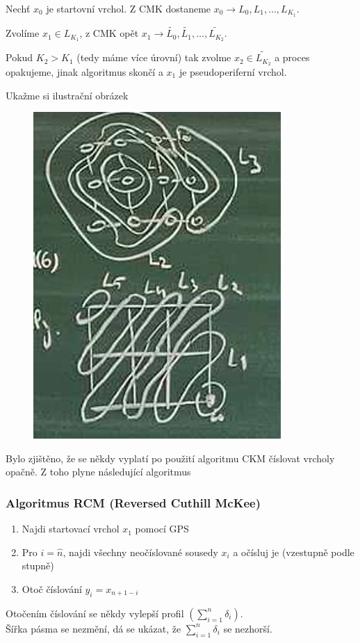 \documentclass[../main.tex]{subfiles}
\begin{document}
Nechť $x_0$ je startovní vrchol. Z CMK dostaneme $x_0 \rightarrow L_0,L_1, \dots, L_{K_1}$.

Zvolíme $x_1\in L_{K_1}$, z CMK opět $x_1 \rightarrow \tilde{L_0}, \tilde{L_1}, \dots, \tilde{L_{K_2}}$.

Pokud $K_2>K_1$ (tedy máme více úrovní) tak zvolme $x_2\in \tilde{L_{K_2}}$ a proces opakujeme, jinak algoritmus skončí a $x_1$ je pseudoperiferní vrchol.

Ukažme si ilustrační obrázek

\begin{example}
    \begin{figure}[H]
        \centering
        \includegraphics{images/26-10-GPS.png}
    \end{figure}
\end{example}

\begin{remark}
    Bylo zjištěno, že se někdy vyplatí po použití algoritmu CKM číslovat vrcholy opačně. Z toho plyne následující algoritmus
\end{remark}

\subsubsection{Algoritmus RCM (Reversed Cuthill McKee)}

\begin{enumerate}
    \item Najdi startovací vrchol $x_1$ pomocí GPS
    \item Pro $i=\hat{n}$, najdi všechny neočíslované sousedy $x_i$ a očísluj je (vzestupně podle stupně)
    \item Otoč číslování $y_i = x_{n+1-i}$ 
\end{enumerate}

Otočením číslování se někdy vylepší profil $(\sum_{i=1}^{n} \delta_i)$.\\
Šířka pásma se nezmění, dá se ukázat, že $\sum_{i=1}^{n} \delta_i$ se nezhorší. 
\end{document}
